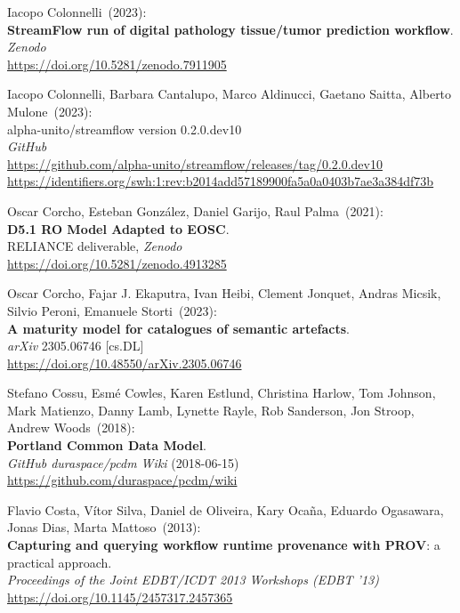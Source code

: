 \begin{thebibliography}{9}
Iacopo Colonnelli~(2023): \\
\textbf{StreamFlow run of digital pathology tissue/tumor prediction workflow}.\\
\emph{Zenodo}\\
\url{https://doi.org/10.5281/zenodo.7911905}

 Iacopo Colonnelli, Barbara Cantalupo, Marco Aldinucci, Gaetano Saitta, Alberto Mulone~(2023): \\
alpha-unito/streamflow version 0.2.0.dev10\\
\emph{GitHub}\\
\url{https://github.com/alpha-unito/streamflow/releases/tag/0.2.0.dev10}\\
\url{https://identifiers.org/swh:1:rev:b2014add57189900fa5a0a0403b7ae3a384df73b}

Oscar Corcho, Esteban González, Daniel Garijo, Raul Palma~(2021): \\
\textbf{D5.1 RO Model Adapted to EOSC}.\\
RELIANCE deliverable, \emph{Zenodo}\\
\url{https://doi.org/10.5281/zenodo.4913285}

Oscar Corcho, Fajar J. Ekaputra, Ivan Heibi, Clement Jonquet, Andras
Micsik, Silvio Peroni, Emanuele Storti~(2023): \\
\textbf{A maturity model for catalogues of semantic artefacts}. \\
\emph{arXiv} 2305.06746 [cs.DL] \\
\url{https://doi.org/10.48550/arXiv.2305.06746}

Stefano Cossu, Esmé Cowles, Karen Estlund, Christina Harlow,
Tom Johnson, Mark Matienzo, Danny Lamb, Lynette Rayle, Rob Sanderson,
Jon Stroop, Andrew Woods~(2018): \\
\textbf{Portland Common Data Model}.\\
\emph{GitHub duraspace/pcdm Wiki} (2018-06-15)\\
\url{https://github.com/duraspace/pcdm/wiki}

Flavio Costa, Vítor Silva, Daniel de Oliveira, Kary Ocaña, Eduardo Ogasawara, Jonas Dias, Marta Mattoso~(2013): \\
\textbf{Capturing and querying workflow runtime provenance with PROV}: a practical approach.\\
\emph{Proceedings of the Joint EDBT/ICDT 2013 Workshops (EDBT '13)}\\
\url{https://doi.org/10.1145/2457317.2457365} 


\end{thebibliography}
